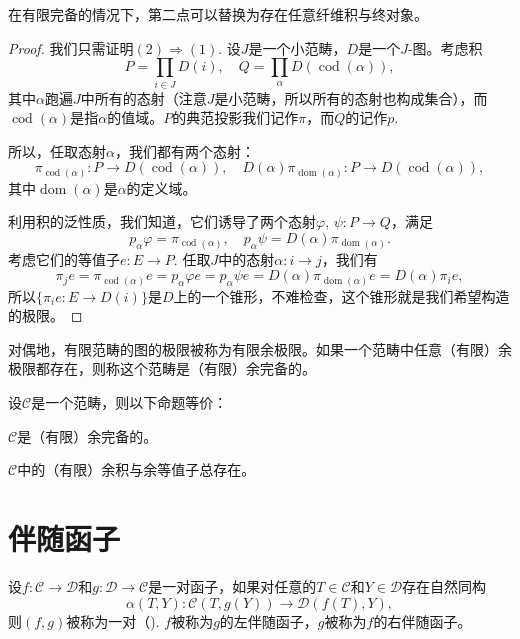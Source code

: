 在有限完备的情况下，第二点可以替换为存在任意纤维积与终对象。

\begin{proof}
我们只需证明$(2)\Rightarrow (1)$. 设$J$是一个小范畴，$D$是一个$J$-图。考虑积
\[
	P=\prod_{i\in J}D(i),\quad Q=\prod_{\alpha}D(\operatorname{cod}(\alpha)),
\]
其中$\alpha$跑遍$J$中所有的态射（注意$J$是小范畴，所以所有的态射也构成集合），而$\operatorname{cod}(\alpha)$是指$\alpha$的值域。$P$的典范投影我们记作$\pi$，而$Q$的记作$p$.

所以，任取态射$\alpha$，我们都有两个态射：
\[
	\pi_{\operatorname{cod}(\alpha)}:P\to D(\operatorname{cod}(\alpha)),\quad D(\alpha)\pi_{\operatorname{dom}(\alpha)}:P\to D(\operatorname{cod}(\alpha)),
\]
其中$\operatorname{dom}(\alpha)$是$\alpha$的定义域。

利用积的泛性质，我们知道，它们诱导了两个态射$\varphi$, $\psi:P\to Q$，满足
\[
	p_\alpha \varphi =\pi_{\operatorname{cod}(\alpha)},\quad p_\alpha\psi=D(\alpha)\pi_{\operatorname{dom}(\alpha)}.
\]
考虑它们的等值子$e:E\to P$. 任取$J$中的态射$\alpha:i\to j$，我们有
\[
	\pi_j e = \pi_{\operatorname{cod}(\alpha)}e=p_\alpha \varphi e=p_\alpha \psi e=D(\alpha)\pi_{\operatorname{dom}(\alpha)}e=D(\alpha)\pi_{i}e,
\]
所以$\{\pi_i e:E\to D(i)\}$是$D$上的一个锥形，不难检查，这个锥形就是我们希望构造的极限。
\end{proof}

\begin{para}
对偶地，有限范畴的图的极限被称为有限余极限。如果一个范畴中任意（有限）余极限都存在，则称这个范畴是（有限）余完备的。
\end{para}

\begin{thm}\label{yuwanbei}
设$\mathcal{C}$是一个范畴，则以下命题等价：
\begin{compactenum}[~~~~(1)]
\item $\mathcal{C}$是（有限）余完备的。
\item $\mathcal{C}$中的（有限）余积与余等值子总存在。
\end{compactenum}
\end{thm}

\section{伴随函子}

\begin{para}
设$f:\mathcal{C}\to \mathcal{D}$和$g:\mathcal{D}\to \mathcal{C}$是一对函子，如果对任意的$T\in\mathcal{C}$和$Y\in\mathcal{D}$存在自然同构
\[
	\alpha(T,Y):\mathcal{C}(T,g(Y))\to \mathcal{D}(f(T),Y),
\]
则$(f,g)$被称为一对（). $f$被称为$g$的左伴随函子，$g$被称为$f$的右伴随函子。
\end{para}

